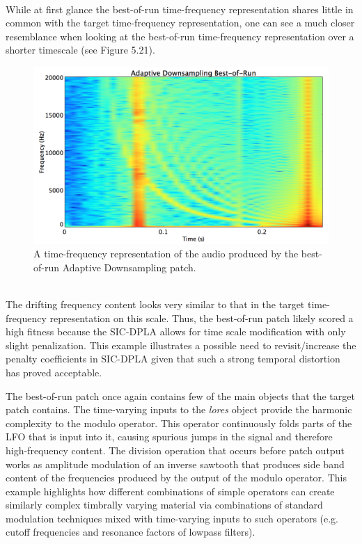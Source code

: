 \documentclass[12pt]{report} 	%
\numberwithin{figure}{chapter}
\numberwithin{table}{chapter}
\numberwithin{equation}{chapter}
\begin{document}
\begin{flushleft}
\begin{figure}[h!]
\end{figure}
\\
While at first glance the best-of-run time-frequency representation shares little in common with the target time-frequency representation, one can see a much closer resemblance when looking at the best-of-run time-frequency representation over a shorter timescale (see Figure 5.21).
\begin{figure}[h!]
\begin{center}
\includegraphics[scale=0.35,width=\linewidth]{AdaptiveDownsamplingBestOfRunSTFT2}
\caption[Zooming in on the best-of-run adaptive downsampling time-frequency representation]{A time-frequency representation of the audio produced by the best-of-run Adaptive Downsampling patch.}
\end{center}
\end{figure}
\\
The drifting frequency content looks very similar to that in the target time-frequency representation on this scale. Thus, the best-of-run patch likely scored a high fitness because the SIC-DPLA allows for time scale modification with only slight penalization. This example illustrates a possible need to revisit/increase the penalty coefficients in SIC-DPLA given that such a strong temporal distortion has proved acceptable.

The best-of-run patch once again contains few of the main objects that the target patch contains. The time-varying inputs to the \textit{lores\texttildelow{}} object provide the harmonic complexity to the modulo operator. This operator continuously folds parts of the LFO that is input into it, causing spurious jumps in the signal and therefore high-frequency content. The division operation that occurs before patch output works as amplitude modulation of an inverse sawtooth that produces side band content of the frequencies produced by the output of the modulo operator. This example highlights how different combinations of simple operators can create similarly complex timbrally varying material via combinations of standard modulation techniques mixed with time-varying inputs to such operators (e.g. cutoff frequencies and resonance factors of lowpass filters). 


\end{flushleft}
\end{document}
